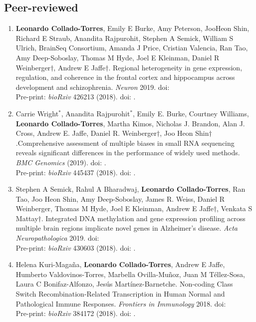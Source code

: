 \subsection{Peer-reviewed}
    \begin{enumerate}
        \item \textbf{Leonardo Collado-Torres}, Emily E Burke, Amy Peterson, JooHeon Shin, Richard E Straub, Anandita Rajpurohit, Stephen A Semick, William S Ulrich, BrainSeq Consortium, Amanda J Price, Cristian Valencia, Ran Tao, Amy Deep-Soboslay, Thomas M Hyde, Joel E Kleinman, Daniel R Weinberger$\dagger$, Andrew E Jaffe$\dagger$. Regional heterogeneity in gene expression, regulation, and coherence in the frontal cortex and hippocampus across development and schizophrenia. \emph{Neuron} 2019. doi: 
        \\ Pre-print: \emph{bioRxiv} 426213 (2018). doi: .
        
        \item Carrie Wright$^{*}$, Anandita Rajpurohit$^{*}$, Emily E. Burke, Courtney Williams, \textbf{Leonardo Collado-Torres}, Martha Kimos, Nicholas J. Brandon, Alan J. Cross, Andrew E. Jaffe, Daniel R. Weinberger$\dagger$, Joo Heon Shin$\dagger$.Comprehensive assessment of multiple biases in small RNA sequencing reveals significant differences in the performance of widely used methods. \emph{BMC Genomics} (2019). doi: .
        \\ Pre-print: \emph{bioRxiv} 445437 (2018). doi: .
        
        \item Stephen A Semick, Rahul A Bharadwaj, \textbf{Leonardo Collado-Torres}, Ran Tao, Joo Heon Shin, Amy Deep-Soboslay, James R. Weiss, Daniel R Weinberger, Thomas M Hyde, Joel E Kleinman, Andrew E Jaffe$\dagger$, Venkata S Mattay$\dagger$. Integrated DNA methylation and gene expression profiling across multiple brain regions implicate novel genes in Alzheimer's disease. \emph{Acta Neuropathologica} 2019. doi: 
        \\ Pre-print: \emph{bioRxiv} 430603 (2018). doi: .
            
        \item Helena Kuri-Magaña, \textbf{Leonardo Collado-Torres}, Andrew E Jaffe, Humberto Valdovinos-Torres, Marbella Ovilla-Muñoz, Juan M Téllez-Sosa, Laura C Bonifaz-Alfonzo, Jesús Martínez-Barnetche. Non-coding Class Switch Recombination-Related Transcription in Human Normal and Pathological Immune Responses. \emph{Frontiers in Immunology} 2018. doi: 
        \\ Pre-print: \emph{bioRxiv} 384172 (2018). doi: .
        

\end{enumerate}
